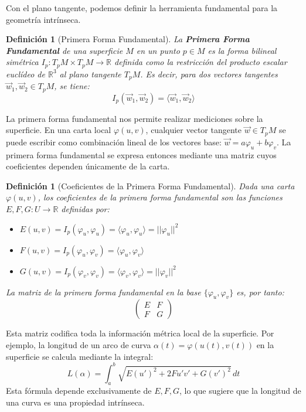 \documentclass[12pt, a4paper]{report}
\theoremstyle{miestilo}
\theoremstyle{midefinicion}
\newtheorem{definicion}[teorema]{Definición}
\begin{document}
Con el plano tangente, podemos definir la herramienta fundamental para la geometría intrínseca.

\begin{definicion}[Primera Forma Fundamental]
La \textbf{Primera Forma Fundamental} de una superficie $M$ en un punto $p \in M$ es la forma bilineal simétrica $I_p: T_pM \times T_pM \to \mathbb{R}$ definida como la restricción del producto escalar euclídeo de $\mathbb{R}^3$ al plano tangente $T_pM$. Es decir, para dos vectores tangentes $\vec{w}_1, \vec{w}_2 \in T_pM$, se tiene:
$$I_p(\vec{w}_1, \vec{w}_2) = \langle \vec{w}_1, \vec{w}_2 \rangle$$
\end{definicion}

La primera forma fundamental nos permite realizar mediciones sobre la superficie. En una carta local $\varphi(u,v)$, cualquier vector tangente $\vec{w} \in T_pM$ se puede escribir como combinación lineal de los vectores base: $\vec{w} = a\varphi_u + b\varphi_v$. La primera forma fundamental se expresa entonces mediante una matriz cuyos coeficientes dependen únicamente de la carta.

\begin{definicion}[Coeficientes de la Primera Forma Fundamental]
Dada una carta $\varphi(u,v)$, los coeficientes de la primera forma fundamental son las funciones $E, F, G: U \to \mathbb{R}$ definidas por:
\begin{itemize}
    \item $E(u,v) = I_p(\varphi_u, \varphi_u) = \langle \varphi_u, \varphi_u \rangle = ||\varphi_u||^2$
    \item $F(u,v) = I_p(\varphi_u, \varphi_v) = \langle \varphi_u, \varphi_v \rangle$
    \item $G(u,v) = I_p(\varphi_v, \varphi_v) = \langle \varphi_v, \varphi_v \rangle = ||\varphi_v||^2$
\end{itemize}
La matriz de la primera forma fundamental en la base $\{\varphi_u, \varphi_v\}$ es, por tanto:
$$\begin{pmatrix} E & F \\ F & G \end{pmatrix}$$
\end{definicion}

Esta matriz codifica toda la información métrica local de la superficie. Por ejemplo, la longitud de un arco de curva $\alpha(t) = \varphi(u(t), v(t))$ en la superficie se calcula mediante la integral:
$$L(\alpha) = \int_a^b \sqrt{E(u')^2 + 2F u'v' + G(v')^2} \, dt$$
Esta fórmula depende exclusivamente de $E, F, G$, lo que sugiere que la longitud de una curva es una propiedad intrínseca.
\end{document}
